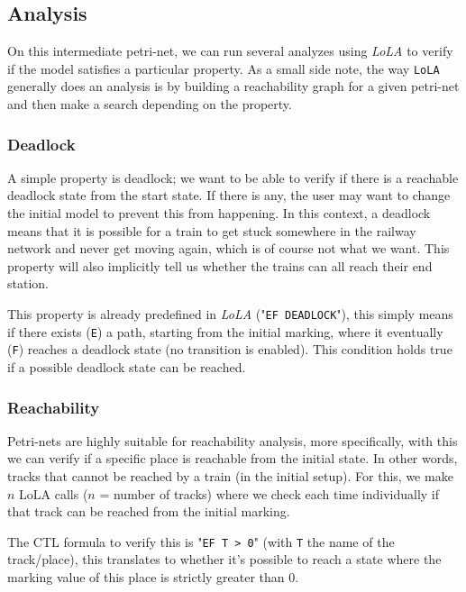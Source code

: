 \documentclass{article}
\begin{document}
\subsection{Analysis}
\label{safety_analysis}

On this intermediate petri-net, we can run several analyzes using \textit{LoLA} to verify if the model satisfies a particular property. As a small side note, the way \texttt{LoLA} generally does an analysis is by building a reachability graph for a given petri-net and then make a search depending on the property.

\subsubsection{Deadlock}

A simple property is deadlock; we want to be able to verify if there is a reachable deadlock state from the start state. If there is any, the user may want to change the initial model to prevent this from happening. In this context, a deadlock means that it is possible for a train to get stuck somewhere in the railway network and never get moving again, which is of course not what we want. This property will also implicitly tell us whether the trains can all reach their end station.

This property is already predefined in \textit{LoLA} ("\texttt{EF DEADLOCK}"), this simply means if there exists (\texttt{E}) a path, starting from the initial marking, where it eventually (\texttt{F}) reaches a deadlock state (no transition is enabled). This condition holds true if a possible deadlock state can be reached.

\subsubsection{Reachability}

Petri-nets are highly suitable for reachability analysis, more specifically, with this we can verify if a specific place is reachable from the initial state. In other words, tracks that cannot be reached by a train (in the initial setup). For this, we make $n$ LoLA calls ($n$ = number of tracks) where we check each time individually if that track can be reached from the initial marking.

The CTL formula to verify this is "\texttt{EF T > 0}" (with \texttt{T} the name of the track/place), this translates to whether it's possible to reach a state where the marking value of this place is strictly greater than $0$.
\end{document}
